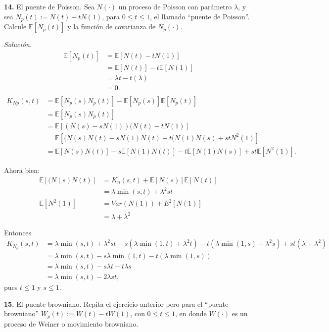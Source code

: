 \documentclass[12pt]{article}
\newcommand{\E}{\mathbb{E}}
\begin{document}
\begin{tcolorbox}[colback=blue!5!white, colframe=blue!5!white, arc=0mm, boxrule=0pt]
    \textbf{14.} El puente de Poisson. Sea $N(\cdot)$ un proceso de Poisson con parámetro $\lambda$, y sea $N_p(t) := N(t) - tN(1)$, para $0 \leq t \leq 1$, el llamado ``puente de Poisson''. Calcule $\E[N_p(t)]$ y la función de covarianza de $N_p (\cdot)$.
\end{tcolorbox} 

\textit{Solución}.
\begin{align*}
    \E[N_p(t)] &= \E[N(t) - tN(1)]\\
    &= \E[N(t)] - t\E[N(1)]\\
    &= \lambda t - t(\lambda) \\
    &= 0.\\
\end{align*}
\begin{align*}
    K_{Np}(s,t) &= \E[N_p(s) N_p(t)] - \E[N_p(s)]\E[N_p(t)]\\
    &= \E [N_p(s) N_p(t)] \\
    &= \E [(N(s)-sN(1))(N(t)-tN(1)]\\
    &= \E [(N(s)N(t)-sN(1)N(t)-t(N(1)N(s)+stN^{2}(1)] \\
    &= \E[N(s)N(t)] - s\E[N(1)N(t)] - t\E[N(1)N(s)] + st \E[N^2(1)].
\end{align*}    

Ahora bien:
\begin{align*}
\E [(N(s)N(t)] &= K_n(s,t) + \E[N(s)]\E[N(t)]\\
&= \lambda \min(s,t) + \lambda^{2}st\\
\E[N^{2}(1)] &= Var(N(1)) + E^{2}[N(1)]\\
&= \lambda + \lambda^{2}
\end{align*}

Entonces
\begin{align*}
    K_{N_p}(s,t) &= \lambda \min(s,t) + \lambda^{2}st - s(\lambda \min(1,t) + \lambda^{2}t) - t(\lambda \min(1,s) + \lambda^{2}s) + st(\lambda + \lambda^{2}) \\
    &= \lambda \min(s,t) - s\lambda\min(1,t) - t(\lambda \min(1,s)) \\
    &= \lambda \min(s,t) - s\lambda t - t\lambda s \\
    &= \lambda \min(s,t) - 2\lambda st,
\end{align*}
pues $t \leq 1$ y $s \leq 1$.

\begin{tcolorbox}[colback=blue!5!white, colframe=blue!5!white, arc=0mm, boxrule=0pt]
    \textbf{15.} El puente browniano. Repita el ejercicio anterior pero para el ``puente browniano'' $W_p(t) := W(t) - tW(1) $, con $0 \leq t \leq 1$, en donde $W(\cdot)$ es un proceso de Weiner o movimiento browniano.
\end{tcolorbox} 
\end{document}
